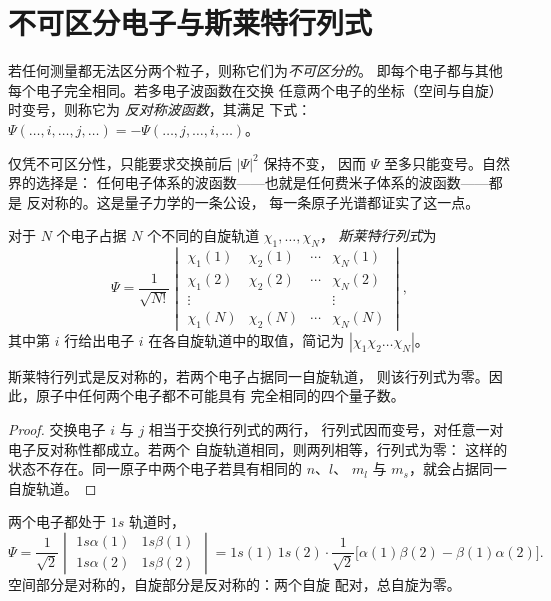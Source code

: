 \section{不可区分电子与斯莱特行列式}

\begin{definition}\label{def:b3:many-electron-atoms:indistinguishable}
若任何测量都无法区分两个粒子，则称它们为\emph{不可区分的}。
即每个电子都与其他每个电子完全相同。若多电子波函数在交换
任意两个电子的坐标（空间与自旋）时变号，则称它为
\emph{反对称波函数}，其满足
下式：
$\Psi(\dots,i,\dots,j,\dots) = -\Psi(\dots,j,\dots,i,\dots)$。
\end{definition}

仅凭不可区分性，只能要求交换前后 $|\Psi|^2$ 保持不变，
因而 $\Psi$ 至多只能变号。自然界的选择是：
任何电子体系的波函数——也就是任何费米子体系的波函数——都是
反对称的。这是量子力学的一条公设，
每一条原子光谱都证实了这一点。

\begin{definition}[斯莱特行列式]\label{def:b3:many-electron-atoms:slater}
对于 $N$ 个电子占据 $N$ 个不同的自旋轨道 $\chi_1, \dots, \chi_N$，
\emph{斯莱特行列式}为
\[
\Psi = \frac{1}{\sqrt{N!}}\begin{vmatrix}
\chi_1(1) & \chi_2(1) & \cdots & \chi_N(1)\\
\chi_1(2) & \chi_2(2) & \cdots & \chi_N(2)\\
\vdots & & & \vdots\\
\chi_1(N) & \chi_2(N) & \cdots & \chi_N(N)
\end{vmatrix},
\]
其中第 $i$ 行给出电子 $i$ 在各自旋轨道中的取值，简记为
$|\chi_1\chi_2\dots\chi_N|$。
\end{definition}

\begin{theorem}[泡利原理]\label{thm:b3:many-electron-atoms:pauli}
斯莱特行列式是反对称的，若两个电子占据同一自旋轨道，
则该行列式为零。因此，原子中任何两个电子都不可能具有
完全相同的四个量子数。
\end{theorem}

\begin{proof}
交换电子 $i$ 与 $j$ 相当于交换行列式的两行，
行列式因而变号，对任意一对电子反对称性都成立。若两个
自旋轨道相同，则两列相等，行列式为零：
这样的状态不存在。同一原子中两个电子若具有相同的 $n$、$l$、
$m_l$ 与 $m_s$，就会占据同一自旋轨道。
\end{proof}

\begin{example}[氦的基态]\label{ex:b3:many-electron-atoms:helium-ground}
两个电子都处于 $1s$ 轨道时，
\[
\Psi = \frac{1}{\sqrt2}\begin{vmatrix}1s\alpha(1) & 1s\beta(1)\\ 1s\alpha(2) &
1s\beta(2)\end{vmatrix} = 1s(1)\,1s(2)\cdot\frac{1}{\sqrt2}\big[\alpha(1)\beta(2)
- \beta(1)\alpha(2)\big].
\]
空间部分是对称的，自旋部分是反对称的：两个自旋
配对，总自旋为零。
\end{example}


